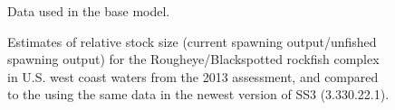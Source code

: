 \documentclass[
]{scrartcl}
\begin{document}
\begin{figure}


\caption{\label{fig-data}Data used in the base model.}

\end{figure}%

\begin{figure}


\caption{\label{fig-RSS_2013}Estimates of relative stock size (current
spawning output/unfished spawning output) for the Rougheye/Blackspotted
rockfish complex in U.S. west coast waters from the 2013 assessment, and
compared to the using the same data in the newest version of SS3
(3.330.22.1).}

\end{figure}%
\end{document}
